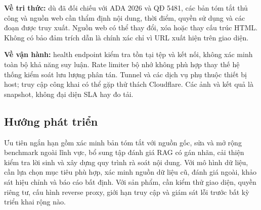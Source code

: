 \textbf{Về tri thức:} dù đã đối chiếu với ADA 2026 và QĐ 5481, các bản tóm tắt thủ công và nguồn web cần thẩm định nội dung, thời điểm, quyền sử dụng và các đoạn được truy xuất. Nguồn web có thể thay đổi, xóa hoặc thay cấu trúc HTML. Không có bảo đảm trích dẫn là chính xác chỉ vì URL xuất hiện trên giao diện.

\textbf{Về vận hành:} health endpoint kiểm tra tồn tại tệp và kết nối, không xác minh toàn bộ khả năng suy luận. Rate limiter bộ nhớ không phù hợp thay thế hệ thống kiểm soát lưu lượng phân tán. Tunnel và các dịch vụ phụ thuộc thiết bị host; truy cập công khai có thể gặp thử thách Cloudflare. Các ảnh và kết quả là snapshot, không đại diện SLA hay đo tải.
\subsection{Hướng phát triển}
Ưu tiên ngắn hạn gồm xác minh bản tóm tắt với nguồn gốc, sửa và mở rộng benchmark ngoài lĩnh vực, bổ sung tập đánh giá RAG có gán nhãn, cải thiện kiểm tra lời sinh và xây dựng quy trình rà soát nội dung. Với mô hình dữ liệu, cần lựa chọn mục tiêu phù hợp, xác minh nguồn dữ liệu cũ, đánh giá ngoài, khảo sát hiệu chỉnh và báo cáo bất định. Với sản phẩm, cần kiểm thử giao diện, quyền riêng tư, cấu hình reverse proxy, giới hạn truy cập và giám sát lỗi trước bất kỳ triển khai rộng nào.
